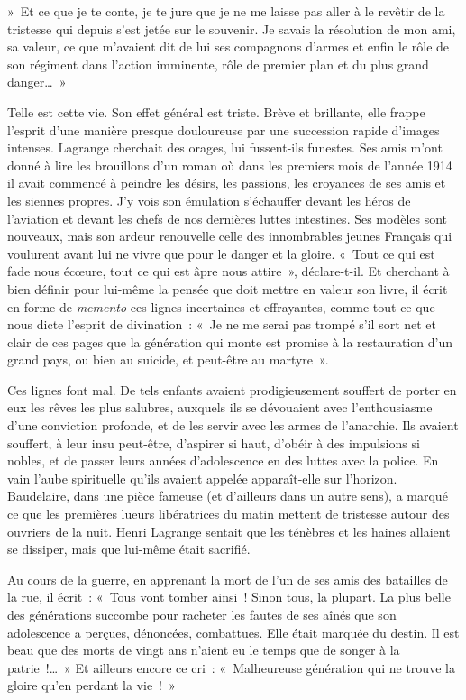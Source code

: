 \documentclass[french,twoside]{book} %
\begin{document}
» Et ce que je te conte, je te jure que je ne me laisse pas aller à le revêtir de la tristesse qui depuis s’est jetée sur le souvenir. Je savais la résolution de mon ami, sa valeur, ce que m’avaient dit de lui ses compagnons d’armes et enfin le rôle de son régiment dans l’action imminente, rôle de premier plan et du plus grand danger… »‌\par
Telle est cette vie. Son effet général est triste. Brève et brillante, elle frappe l’esprit d’une manière presque douloureuse par une succession rapide d’images intenses. Lagrange cherchait des orages, lui fussent-ils funestes. Ses amis m’ont donné à lire les brouillons d’un roman où dans les premiers mois de l’année 1914 il avait commencé à peindre les désirs, les passions, les croyances de ses amis et les siennes propres. J’y vois son émulation s’échauffer devant les héros de l’aviation et devant les chefs de nos dernières luttes intestines. Ses modèles sont nouveaux, mais son ardeur renouvelle celle des innombrables jeunes Français qui voulurent avant lui ne vivre que pour le danger et la gloire. « Tout ce qui est fade nous écœure, tout ce qui est âpre nous attire », déclare-t-il. Et cherchant à bien définir pour lui-même la pensée que doit mettre en valeur son livre, il écrit en forme de {\itshape memento} ces lignes incertaines et effrayantes, comme tout ce que nous dicte l’esprit de divination : « Je ne me serai pas trompé s’il sort net et clair de ces pages que la génération qui monte est promise à la restauration d’un grand pays, ou bien au suicide, et peut-être au martyre ».‌\par
\par
Ces lignes font mal. De tels enfants avaient prodigieusement souffert de porter en eux les rêves les plus salubres, auxquels ils se dévouaient avec l’enthousiasme d’une conviction profonde, et de les servir avec les armes de l’anarchie. Ils avaient souffert, à leur insu peut-être, d’aspirer si haut, d’obéir à des impulsions si nobles, et de passer leurs années d’adolescence en des luttes avec la police. En vain l’aube spirituelle qu’ils avaient appelée apparaît-elle sur l’horizon. Baudelaire, dans une pièce fameuse (et d’ailleurs dans un autre sens), a marqué ce que les premières lueurs libératrices du matin mettent de tristesse autour des ouvriers de la nuit. Henri Lagrange sentait que les ténèbres et les haines allaient se dissiper, mais que lui-même était sacrifié.‌\par
Au cours de la guerre, en apprenant la mort de l’un de ses amis des batailles de la rue, il écrit : « Tous vont tomber ainsi ! Sinon tous, la plupart. La plus belle des générations succombe pour racheter les fautes de ses aînés que son adolescence a perçues, dénoncées, combattues. Elle était marquée du destin. Il est beau que des morts de vingt ans n’aient eu le temps que de songer à la patrie !… » Et ailleurs encore ce cri : « Malheureuse génération qui ne trouve la gloire qu’en perdant la vie ! »‌\par
\end{document}
